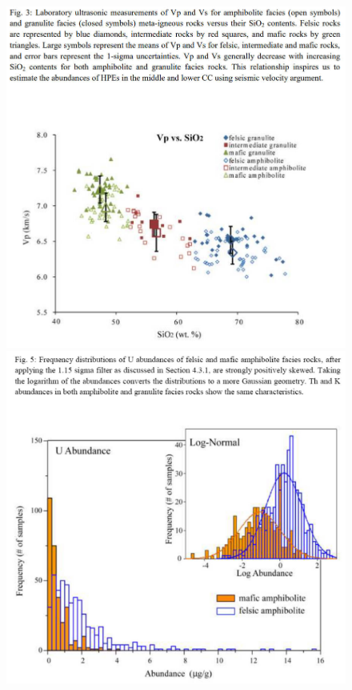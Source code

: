 				\begin{figure}[H]
					\centering
					\includegraphics[scale = 0.27]{./Pics/Pic-Vp_SiO2.jpg}
					\includegraphics[scale = 0.2]{./Pics/Pic-Abundance_Distribution.jpg}
				\end{figure}
